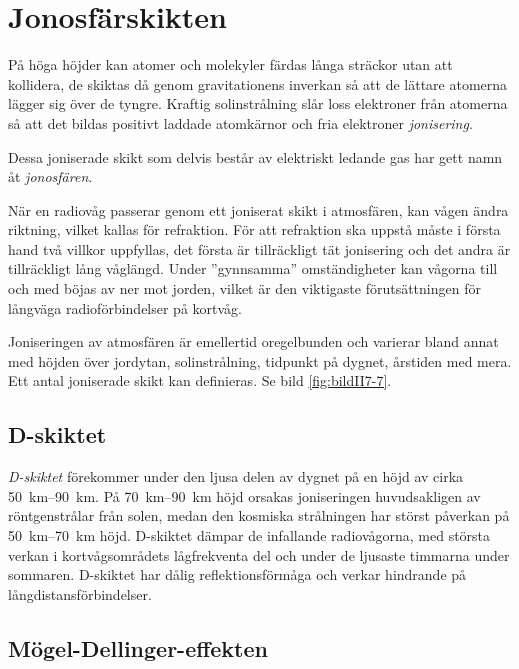 \section{Jonosfärskikten}
\label{vågutbredning_jonosfärskikten}

På höga höjder kan atomer och molekyler färdas långa sträckor utan att
kollidera, de skiktas då genom gravitationens inverkan så att de lättare
atomerna lägger sig över de tyngre.
Kraftig solinstrålning slår loss elektroner från atomerna så att det bildas
positivt laddade atomkärnor och fria elektroner \emph{jonisering}.

Dessa joniserade skikt som delvis består av elektriskt ledande gas har
gett namn åt \emph{jonosfären}.

När en radiovåg passerar genom ett joniserat skikt i atmosfären, kan vågen
ändra riktning, vilket kallas för refraktion.
För att refraktion ska uppstå måste i första hand två villkor uppfyllas, det
första är tillräckligt tät jonisering och det andra är tillräckligt
lång våglängd.
Under ''gynnsamma'' omständigheter kan vågorna till och med böjas av
ner mot jorden, vilket är den viktigaste förutsättningen för långväga
radioförbindelser på kortvåg.

Joniseringen av atmosfären är emellertid oregelbunden och varierar
bland annat med höjden över jordytan, solinstrålning, tidpunkt på dygnet,
årstiden med mera.
Ett antal joniserade skikt kan definieras.
Se bild \ref{fig:bildII7-7}.

\subsection{D-skiktet}
\label{d-skiktet}

\emph{D-skiktet} förekommer under den ljusa delen av dygnet på en höjd av cirka
\SIrange{50}{90}{\kilo\metre}.
På \SIrange{70}{90}{\kilo\metre} höjd orsakas joniseringen huvudsakligen av
röntgenstrålar från solen, medan den kosmiska strålningen har störst påverkan på
\SIrange{50}{70}{\kilo\metre} höjd.
D-skiktet dämpar de infallande radiovågorna, med största verkan i
kortvågsområdets lågfrekventa del och under de ljusaste timmarna under sommaren.
D-skiktet har dålig reflektionsförmåga och verkar hindrande på
långdistansförbindelser.

\subsection{Mögel-Dellinger-effekten}


